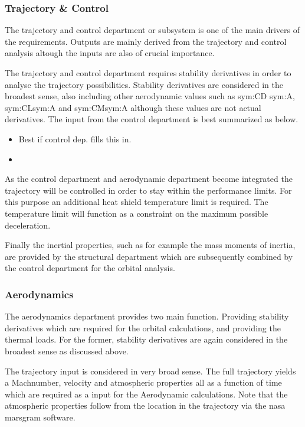 \subsubsection{Trajectory \& Control}

The trajectory and control department or subsystem is one of the main drivers of the requirements. Outputs are mainly derived from the trajectory and control analysis altough the inputs are also of crucial importance. 

The trajectory and control department requires stability derivatives in order to analyse the trajectory possibilities. Stability derivatives are considered in the broadest sense, also including other aerodynamic values such as \gls{sym:CD} \gls{sym:A}, \gls{sym:CL}\gls{sym:A} and \gls{sym:CM}\gls{sym:A} although these values are not actual derivatives. The input from the control department is  best summarized as below.

\begin{itemize}
\item Best if control dep. fills this in.
\item 
\end{itemize}

As the control department and aerodynamic department become integrated the trajectory will be controlled in order to stay within the performance limits. For this purpose an additional heat shield temperature limit is required. The temperature limit will function as a constraint on the maximum possible deceleration.

Finally the inertial properties, such as for example the mass moments of inertia, are provided by the structural department which are subsequently combined by the control department for the orbital analysis.

\subsubsection{Aerodynamics}
The aerodynamics department provides two main function. Providing stability derivatives which are required for the orbital calculations, and providing the thermal loads. 
For the former, stability derivatives are again considered in the broadest sense as discussed above. 

The trajectory input is considered in very broad sense. The full trajectory yields a Machnumber, velocity and atmospheric properties all as a function of time which are required as a input for the Aerodynamic calculations. Note that the atmospheric properties follow from the location in the trajectory via the \gls{nasa} \gls{marsgram} software\cite{Justus2001}.

